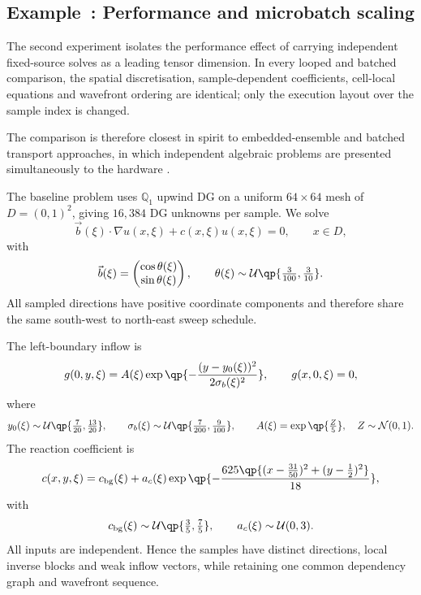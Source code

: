 \documentclass[final]{amsart}
\newcounter{numexample}
\newcommand{\CurrentExample}{Example~\thenumexample}
\newcommand{\ExampleSubsection}[2]{%
  \refstepcounter{numexample}%
  \label{#2-exno}%
  \subsection{\CurrentExample: #1}%
  \label{#2}%
}
\begin{document}
\ExampleSubsection{Performance and microbatch scaling}
{subsec:batching_scaling}

The second experiment isolates the performance effect of carrying
independent fixed-source solves as a leading tensor dimension. In every
looped and batched comparison, the spatial discretisation,
sample-dependent coefficients, cell-local equations and wavefront
ordering are identical; only the execution layout over the sample
index is changed.

The comparison is therefore closest in spirit to embedded-ensemble and
batched transport approaches, in which independent algebraic problems
are presented simultaneously to the hardware
\cite{PhippsEtAl2017EmbeddedEnsemble, DEliaEtAl2018EnsembleGrouping,
  SuauEtAl2025Batched}.

The baseline problem uses $\mathbb{Q}_1$ upwind DG on a uniform
$64\times64$ mesh of $D=(0,1)^2$, giving $16{,}384$ DG unknowns per
sample. We solve
\begin{equation}
\vec b(\xi)\cdot\nabla u(x,\xi)
+
c(x,\xi)u(x,\xi)
=
0,
\qquad x\in D,
\label{eq:ex2_transport_problem}
\end{equation}
with
\begin{equation}
\vec b(\xi)
=
\begin{pmatrix}
\cos{\theta(\xi)}\\
\sin{\theta(\xi)}
\end{pmatrix},
\qquad
\theta(\xi)\sim
\mathcal U\qp{\tfrac{3}{100},\tfrac{3}{10}}.
\label{eq:ex2_direction}
\end{equation}
All sampled directions have positive coordinate components and
therefore share the same south-west to north-east sweep schedule.

The left-boundary inflow is
\begin{equation}
g(0,y,\xi)
=
A(\xi)
\exp\qp{
-\frac{(y-y_0(\xi))^2}{2\sigma_b(\xi)^2}
},
\qquad
g(x,0,\xi)=0,
\label{eq:ex2_inflow}
\end{equation}
where
\begin{equation}
y_0(\xi)\sim
\mathcal U\qp{\tfrac{7}{20},\tfrac{13}{20}},
\qquad
\sigma_b(\xi)\sim
\mathcal U\qp{\tfrac{7}{200},\tfrac{9}{100}},
\qquad
A(\xi)=\exp\qp{\tfrac{Z}{5}},
\quad
Z\sim\mathcal N(0,1).
\label{eq:ex2_inflow_parameters}
\end{equation}
The reaction coefficient is
\begin{equation}
c(x,y,\xi)
=
c_{\mathrm{bg}}(\xi)
+
a_c(\xi)
\exp\qp{
-\frac{
625\qp{(x-\tfrac{31}{50})^2+(y-\tfrac12)^2}
}{18}
},
\label{eq:ex2_absorption}
\end{equation}
with
\begin{equation}
c_{\mathrm{bg}}(\xi)
\sim
\mathcal U\qp{\tfrac35,\tfrac75},
\qquad
a_c(\xi)\sim\mathcal U(0,3).
\label{eq:ex2_absorption_parameters}
\end{equation}
All inputs are independent. Hence the samples have distinct directions,
local inverse blocks and weak inflow vectors, while retaining one
common dependency graph and wavefront sequence.
\end{document}
